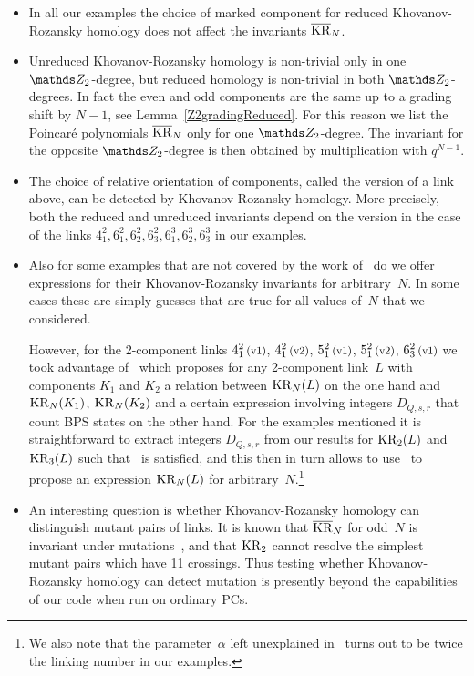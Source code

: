 \documentclass{compositio}
\theoremstyle{definition}
\numberwithin{equation}{section}
\begin{document}
\begin{itemize}
\item 
In all our examples the choice of marked component for reduced Khovanov-Rozansky homology does not affect the invariants $\overline{\operatorname{KR}}_{N}$. 
\item 
Unreduced Khovanov-Rozansky homology is non-trivial only in one $\nZ_{2}$-degree, but reduced homology is non-trivial in both $\nZ_{2}$-degrees. In fact the even and odd components are the same up to a grading shift by $N-1$, see Lemma~\ref{Z2gradingReduced}. For this reason we list the Poincar\'e polynomials $\overline{\operatorname{KR}}_{N}$ only for one $\nZ_{2}$-degree. The invariant for the opposite $\nZ_{2}$-degree is then obtained by multiplication with $q^{N-1}$. 
\item 
The choice of relative orientation of components, called the version of a link above, can be detected by Khovanov-Rozansky homology. More precisely, both the reduced and unreduced invariants depend on the version in the case of the links $4_{1}^2, 6_{1}^2, 6_{2}^2, 6_{3}^2, 6_{1}^3, 6_{2}^3, 6_{3}^3$ in our examples. 
\item 
Also for some examples that are not covered by the work of~\cite{r0508510, r0607544} do we offer expressions for their Khovanov-Rozansky invariants for arbitrary~$N$. In some cases these are simply guesses that are true for all values of~$N$ that we considered. 

However, for the 2-component links $4_{1}^2\,\text{{\footnotesize (v1)}}$, $4_{1}^2\,\text{{\footnotesize (v2)}}$, $5_{1}^2\,\text{{\footnotesize (v1)}}$, $5_{1}^2\,\text{{\footnotesize (v2)}}$, $6_{3}^2\,\text{{\footnotesize (v1)}}$ we took advantage of~\cite[Eq.\,(5.5)]{gsv0412243} which proposes for any 2-component link~$L$ with components $K_{1}$ and $K_{2}$ a relation between $\operatorname{KR}_{N}(L)$ on the one hand and $\operatorname{KR}_N(K_{1})$, $\operatorname{KR}_N(K_{2})$ and a certain expression involving integers $D_{Q,s,r}$ that count BPS states on the other hand. For the examples mentioned it is straightforward to extract integers $D_{Q,s,r}$ from our results for $\operatorname{KR}_{2}(L)$ and $\operatorname{KR}_{3}(L)$ such that~\cite[Eq.\,(5.5)]{gsv0412243} is satisfied, and this then in turn allows to use~\cite[Eq.\,(5.5)]{gsv0412243} to propose an expression $\operatorname{KR}_{N}(L)$ for arbitrary~$N$.\footnote{We also note that the parameter~$\alpha$ left unexplained in~\cite{gsv0412243} turns out to be twice the linking number in our examples.}
\item 
An interesting question is whether Khovanov-Rozansky homology can distinguish mutant pairs of links. It is known that $\overline{\operatorname{KR}}_{N}$ for odd~$N$ is invariant under mutations~\cite{j1101.3302}, and that $\operatorname{KR}_{2}$ cannot resolve the simplest mutant pairs which have 11 crossings. Thus testing whether Khovanov-Rozansky homology can detect mutation is presently beyond the capabilities of our code when run on ordinary PCs. 
\end{itemize}
\end{document}

